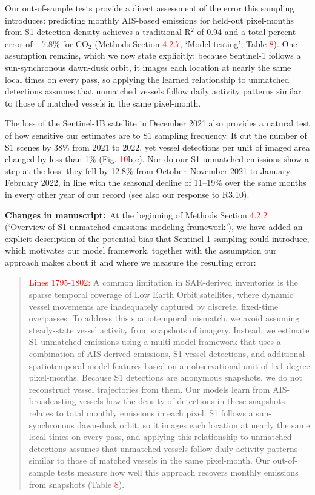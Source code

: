 \documentclass[11pt]{article}
\newcommand{\changes}{\par\medskip\noindent%
  \textbf{\textcolor{changegreen}{Changes in manuscript:}}\ }
\begin{document}
Our out-of-sample tests provide a direct assessment of the error this sampling introduces: predicting monthly AIS-based emissions for held-out pixel-months from S1 detection density achieves a traditional R$^{2}$ of 0.94 and a total percent error of $-$7.8\% for CO$_2$ (Methods Section \textcolor{red}{4.2.7}, `Model testing'; Table \textcolor{red}{8}). One assumption remains, which we now state explicitly: because Sentinel-1 follows a sun-synchronous dawn-dusk orbit, it images each location at nearly the same local times on every pass, so applying the learned relationship to unmatched detections assumes that unmatched vessels follow daily activity patterns similar to those of matched vessels in the same pixel-month.

The loss of the Sentinel-1B satellite in December 2021 also provides a natural test of how sensitive our estimates are to S1 sampling frequency. It cut the number of S1 scenes by 38\% from 2021 to 2022, yet vessel detections per unit of imaged area changed by less than 1\% (Fig. \textcolor{red}{10}b,c). Nor do our S1-unmatched emissions show a step at the loss: they fell by 12.8\% from October--November 2021 to January--February 2022, in line with the seasonal decline of 11--19\% over the same months in every other year of our record (see also our response to R3.10).

\changes At the beginning of Methods Section \textcolor{red}{4.2.2} (`Overview of S1-unmatched emissions modeling framework'), we have added an explicit description of the potential bias that Sentinel-1 sampling could introduce, which motivates our model framework, together with the assumption our approach makes about it and where we measure the resulting error:

\begin{quote}
\textcolor{red}{Lines 1795-1802:}
A common limitation in SAR-derived inventories is the sparse temporal coverage of Low Earth Orbit satellites, where dynamic vessel movements are inadequately captured by discrete, fixed-time overpasses. To address this spatiotemporal mismatch, we avoid assuming steady-state vessel activity from snapshots of imagery. Instead, we estimate S1-unmatched emissions using a multi-model framework that uses a combination of AIS-derived emissions, S1 vessel detections, and additional spatiotemporal model features based on an observational unit of 1x1 degree pixel-months. Because S1 detections are anonymous snapshots, we do not reconstruct vessel trajectories from them. Our models learn from AIS-broadcasting vessels how the density of detections in these snapshots relates to total monthly emissions in each pixel. S1 follows a sun-synchronous dawn-dusk orbit, so it images each location at nearly the same local times on every pass, and applying this relationship to unmatched detections assumes that unmatched vessels follow daily activity patterns similar to those of matched vessels in the same pixel-month. Our out-of-sample tests measure how well this approach recovers monthly emissions from snapshots (Table \textcolor{red}{8}).
\end{quote}
\end{document}
